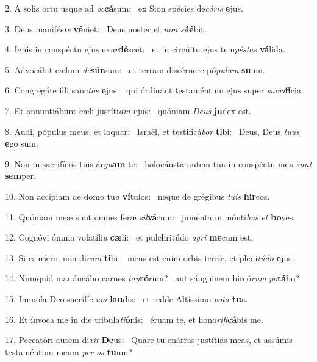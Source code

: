 2. A solis ortu usque ad \textit{oc}\textbf{cá}sum: \ast\  ex Sion spécies de\textit{có}\textit{ris} \textbf{e}jus.\

3. Deus manifés\textit{te} \textbf{vé}niet: \ast\  Deus noster et \textit{non} \textit{si}\textbf{lé}bit.\

4. Ignis in conspéctu ejus ex\textit{ar}\textbf{dé}scet: \ast\  et in circúitu ejus tem\textit{pés}\textit{tas} \textbf{vá}lida.\

5. Advocábit cælum \textit{de}\textbf{súr}sum: \ast\  et terram discérnere pó\textit{pu}\textit{lum} \textbf{su}um.\

6. Congregáte illi sanc\textit{tos} \textbf{e}jus: \ast\  qui órdinant testaméntum ejus super \textit{sa}\textit{cri}\textbf{fí}cia.\

7. Et annuntiábunt cæli justíti\textit{am} \textbf{e}jus: \ast\  quóniam \textit{De}\textit{us} \textbf{ju}dex est.\

8. Audi, pópulus meus, et loquar: \dag\  Israël, et testificá\textit{bor} \textbf{ti}bi: \ast\  Deus, Deus \textit{tu}\textit{us} \textbf{e}go sum.\

9. Non in sacrifíciis tuis ár\textit{gu}\textbf{am} te: \ast\  holocáusta autem tua in conspéctu me\textit{o} \textit{sunt} \textbf{sem}per.\

10. Non accípiam de domo tu\textit{a} \textbf{ví}tulos: \ast\  neque de grégibus \textit{tu}\textit{is} \textbf{hir}cos.\

11. Quóniam meæ sunt omnes feræ \textit{sil}\textbf{vá}rum: \ast\  juménta in mónti\textit{bus} \textit{et} \textbf{bo}ves.\

12. Cognóvi ómnia volatíli\textit{a} \textbf{cæ}li: \ast\  et pulchritúdo \textit{a}\textit{gri} \textbf{me}cum est.\

13. Si esuríero, non di\textit{cam} \textbf{ti}bi: \ast\  meus est enim orbis terræ, et pleni\textit{tú}\textit{do} \textbf{e}jus.\

14. Numquid manducábo carnes \textit{tau}\textbf{ró}rum? \ast\  aut sánguinem hircó\textit{rum} \textit{po}\textbf{tá}bo?\

15. Immola Deo sacrifíci\textit{um} \textbf{lau}dis: \ast\  et redde Altíssimo \textit{vo}\textit{ta} \textbf{tu}a.\

16. Et ínvoca me in die tribula\textit{ti}\textbf{ó}nis: \ast\  éruam te, et hono\textit{ri}\textit{fi}\textbf{cá}bis me.\

17. Peccatóri autem di\textit{xit} \textbf{De}us: \ast\  Quare tu enárras justítias meas, et assúmis testaméntum meum \textit{per} \textit{os} \textbf{tu}um?\

